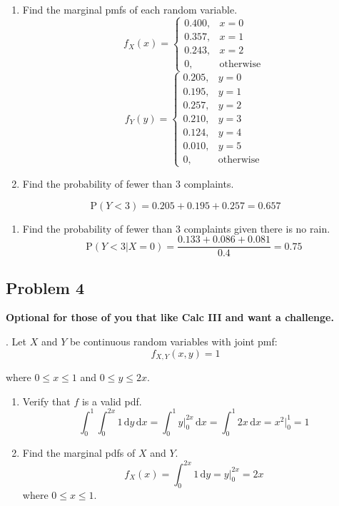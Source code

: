 \documentclass[
]{book}
\providecommand{\tightlist}{%
  \setlength{\itemsep}{0pt}\setlength{\parskip}{0pt}}
\begin{document}
\begin{enumerate}
\def\labelenumi{\alph{enumi}.}
\setcounter{enumi}{1}
\item
  Find the marginal pmfs of each random variable.
  \[
  f_X(x)=\left\{\begin{array}{ll} 0.400, & x=0 \\
  0.357, & x=1 \\
  0.243, & x=2 \\
  0, & \mbox{otherwise} 
  \end{array}\right.
  \]
  \[
  f_Y(y)=\left\{\begin{array}{ll} 0.205, & y=0 \\
  0.195, & y=1 \\
  0.257, & y=2 \\
  0.210, & y=3 \\
  0.124, & y=4 \\
  0.010, & y=5 \\
  0, & \mbox{otherwise} 
  \end{array}\right.
  \]
\item
  Find the probability of fewer than 3 complaints.
\end{enumerate}

\[
\mbox{P}(Y<3)=0.205+0.195+0.257=0.657
\]

\begin{enumerate}
\def\labelenumi{\alph{enumi}.}
\setcounter{enumi}{3}
\tightlist
\item
  Find the probability of fewer than 3 complaints given there is no rain.
  \[
  \mbox{P}(Y<3|X=0)=\frac{0.133+0.086+0.081}{0.4}=0.75
  \]
\end{enumerate}

\hypertarget{problem-4-5}{%
\subsection{Problem 4}\label{problem-4-5}}

\textbf{Optional for those of you that like Calc III and want a challenge.}

. Let \(X\) and \(Y\) be continuous random variables with joint pmf:
\[
f_{X,Y}(x,y)=1
\]

where \(0 \leq x \leq 1\) and \(0 \leq y \leq 2x\).

\begin{enumerate}
\def\labelenumi{\alph{enumi}.}
\item
  Verify that \(f\) is a valid pdf.
  \[
  \int_0^1 \int_0^{2x} 1 \,\mathrm{d}y \,\mathrm{d}x = \int_0^1 y\bigg|_0^{2x}\,\mathrm{d}x = \int_0^1 2x\,\mathrm{d}x = x^2\bigg|_0^1 = 1
  \]
\item
  Find the marginal pdfs of \(X\) and \(Y\).
  \[
  f_X(x)=\int_0^{2x} 1 \,\mathrm{d}y = y\bigg|_0^{2x}=2x
  \]
  where \(0\leq x \leq 1\).
\end{enumerate}
\end{document}
